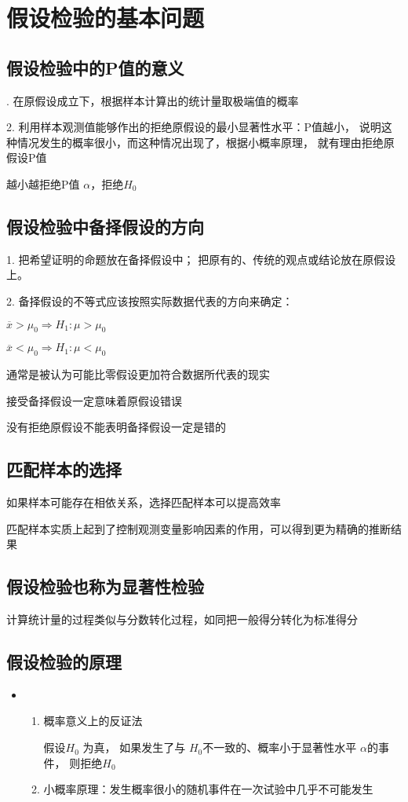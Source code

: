 \documentclass[UTF8,10pt]{book}
\begin{document}
    \section{假设检验的基本问题}
        \subsection{假设检验中的P值的意义}
        {. 在原假设成立下，根据样本计算出的统计量取极端值的概率 
        
        2. 利用样本观测值能够作出的拒绝原假设的最小显著性水平：P值越小，
        说明这种情况发生的概率很小，而这种情况出现了，根据小概率原理，
        就有理由拒绝原假设P值}
        
        越小越拒绝P值  $\alpha$，拒绝$H_0$
        \subsection{假设检验中备择假设的方向}
        1. 把希望证明的命题放在备择假设中； 
        把原有的、传统的观点或结论放在原假设上。 
        
        2. 备择假设的不等式应该按照实际数据代表的方向来确定： 
        
        $ \overline{x} > \mu_0 \Rightarrow H_1:\mu>\mu_0 $ 
        
        $ \overline{x} < \mu_0 \Rightarrow H_1:\mu<\mu_0 $ 
        
        通常是被认为可能比零假设更加符合数据所代表的现实

        {\kaishu 接受备择假设一定意味着原假设错误	
        
        没有拒绝原假设不能表明备择假设一定是错的}
        \subsection{匹配样本的选择}	
        如果样本可能存在相依关系，选择匹配样本可以提高效率 
        
        匹配样本实质上起到了控制观测变量影响因素的作用，可以得到更为精确的推断结果
        \subsection{假设检验也称为显著性检验}	

        计算统计量的过程类似与分数转化过程，如同把一般得分转化为标准得分	

        \subsection{假设检验的原理}	
        {\kaishu
		\begin{itemize}
			\item [] {
				\begin{enumerate}
					\item 概率意义上的反证法 
					
					假设$ H_0 $ 为真，
					如果发生了与 $ H_0 $不一致的、概率小于显著性水平 $ \alpha $的事件，
					则拒绝$ H_0 $ 
					\item 小概率原理：发生概率很小的随机事件在一次试验中几乎不可能发生
				\end{enumerate}
			}
		\end{itemize}
		}
	
\end{document}
